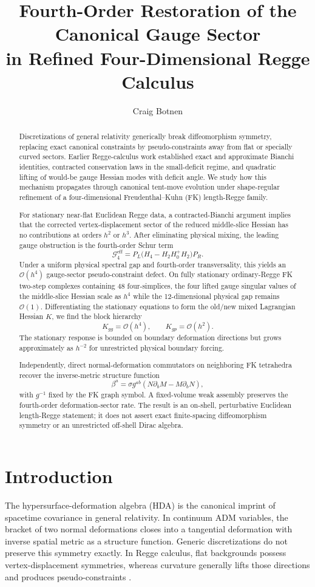 \documentclass[11pt]{article}
\title{Fourth-Order Restoration of the Canonical Gauge Sector\\in Refined Four-Dimensional Regge Calculus}
\author{Craig Botnen}
\date{}
\newcommand{\Oh}{\mathcal{O}}
\newcommand{\Kgg}{K_{gg}}
\newcommand{\Kgp}{K_{gp}}
\newcommand{\Gfour}{\mathcal{G}^{\mathrm{eff}}_4}
\newcommand{\PL}{P_L}
\newcommand{\PR}{P_R}
\begin{document}
\maketitle
\begin{abstract}
Discretizations of general relativity generically break diffeomorphism symmetry, replacing exact canonical constraints by pseudo-constraints away from flat or specially curved sectors. Earlier Regge-calculus work established exact and approximate Bianchi identities, contracted conservation laws in the small-deficit regime, and quadratic lifting of would-be gauge Hessian modes with deficit angle. We study how this mechanism propagates through canonical tent-move evolution under shape-regular refinement of a four-dimensional Freudenthal--Kuhn (FK) length-Regge family.

For stationary near-flat Euclidean Regge data, a contracted-Bianchi argument implies that the corrected vertex-displacement sector of the reduced middle-slice Hessian has no contributions at orders $h^2$ or $h^3$. After eliminating physical mixing, the leading gauge obstruction is the fourth-order Schur term
\[
\Gfour=\PL\bigl(H_4-H_2H_0^+H_2\bigr)\PR.
\]
Under a uniform physical spectral gap and fourth-order transversality, this yields an $\Oh(h^4)$ gauge-sector pseudo-constraint defect. On fully stationary ordinary-Regge FK two-step complexes containing 48 four-simplices, the four lifted gauge singular values of the middle-slice Hessian scale as $h^4$ while the 12-dimensional physical gap remains $\Oh(1)$. Differentiating the stationary equations to form the old/new mixed Lagrangian Hessian $K$, we find the block hierarchy
\[
\Kgg=\Oh(h^4),\qquad \Kgp=\Oh(h^2).
\]
The stationary response is bounded on boundary deformation directions but grows approximately as $h^{-2}$ for unrestricted physical boundary forcing.

Independently, direct normal-deformation commutators on neighboring FK tetrahedra recover the inverse-metric structure function
\[
\beta^a=\sigma g^{ab}(N\partial_bM-M\partial_bN),
\]
with $g^{-1}$ fixed by the FK graph symbol. A fixed-volume weak assembly preserves the fourth-order deformation-sector rate. The result is an on-shell, perturbative Euclidean length-Regge statement; it does not assert exact finite-spacing diffeomorphism symmetry or an unrestricted off-shell Dirac algebra.
\end{abstract}

\section{Introduction}
The hypersurface-deformation algebra (HDA) is the canonical imprint of spacetime covariance in general relativity. In continuum ADM variables, the bracket of two normal deformations closes into a tangential deformation with inverse spatial metric as a structure function. Generic discretizations do not preserve this symmetry exactly. In Regge calculus, flat backgrounds possess vertex-displacement symmetries, whereas curvature generally lifts those directions and produces pseudo-constraints \cite{BahrDittrich2009,DittrichHoehn2010}.
\end{document}
